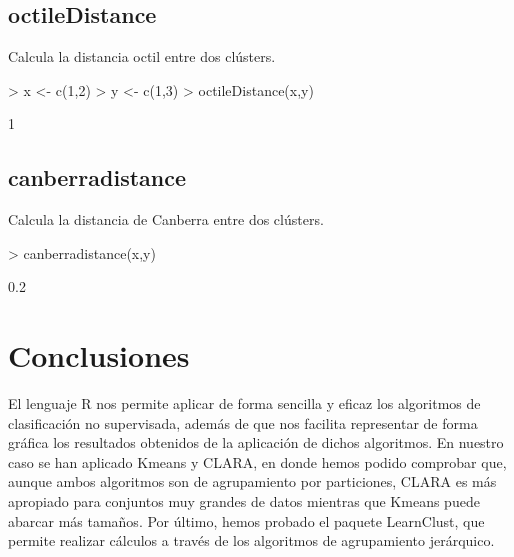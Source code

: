 \documentclass [a4paper] {article}
\begin{document}
\subsection{octileDistance}

Calcula la distancia octil entre dos clústers.

\begin{Schunk}
\begin{Sinput}
> x <- c(1,2)
> y <- c(1,3)
> octileDistance(x,y)
\end{Sinput}
\begin{Soutput}
[1] 1
\end{Soutput}
\end{Schunk}

\subsection{canberradistance}

Calcula la distancia de Canberra entre dos clústers.

\begin{Schunk}
\begin{Sinput}
> canberradistance(x,y)
\end{Sinput}
\begin{Soutput}
[1] 0.2
\end{Soutput}
\end{Schunk}

\section{Conclusiones}

El lenguaje R nos permite aplicar de forma sencilla y eficaz los algoritmos de clasificación no supervisada, además de que nos facilita representar de forma gráfica los resultados obtenidos de la aplicación de dichos algoritmos. En nuestro caso se han aplicado Kmeans y CLARA, en donde hemos podido comprobar que, aunque ambos algoritmos son de agrupamiento por particiones, CLARA es más apropiado para conjuntos muy grandes de datos mientras que Kmeans puede abarcar más tamaños. Por último, hemos probado el paquete LearnClust, que permite realizar cálculos a través de los algoritmos de agrupamiento jerárquico.
\end{document}

